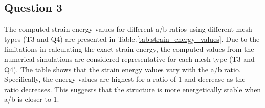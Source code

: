 \documentclass[twoside,twocolumn,10pt]{article}
\begin{document}







\subsection{Question 3}

The computed strain energy values for different a/b ratios using different mesh types (T3 and Q4) are presented in Table.\ref{tab:strain_energy_values}. Due to the limitations in calculating the exact strain energy, the computed values from the numerical simulations are considered representative for each mesh type (T3 and Q4). The table shows that the strain energy values vary with the a/b ratio. Specifically, the energy values are highest for a ratio of 1 and decrease as the ratio decreases. This suggests that the structure is more energetically stable when a/b is closer to 1. 
\end{document}
